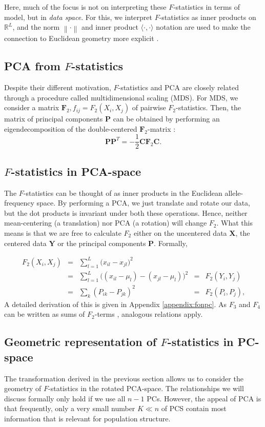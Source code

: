 \documentclass[12pt,a4pape, fullpage]{article}
\newcommand{\norm}[1]{\left\lVert#1\right\rVert}
\newcommand{\MX}{\mathbf{X}} %
\newcommand{\MC}{\mathbf{C}} %
\newcommand{\MY}{\mathbf{Y}} %
\newcommand{\MF}{\mathbf{F}_2} %
\newcommand{\MP}{\mathbf{P}} %
\begin{document}
Here, much of the focus is not on interpreting these $F$-statistics in terms of model, but in \emph{data space}. For this, we interpret $F$-statistics as inner products on $\mathbb{R}^L$, and the norm $\norm{\cdot}$ and inner product $\langle\cdot, \cdot \rangle$ notation are used to make the connection to Euclidean geometry more explicit \citep[see][for a thorough introduction to this interpretation]{oteo-garcia2021}.

\subsection{PCA from $F$-statistics}
Despite their different motivation, $F$-statistics and PCA are closely related through a procedure called multidimensional scaling (MDS). For MDS, we consider a matrix 	$\MF, f_{ij} = F_2(X_i, X_j)$ of pairwise $F_2$-statistics. Then, the matrix of principal components $\MP$ can be obtained by performing an eigendecomposition of the double-centered $\MF$-matrix  \cite{gower1966}:
\begin{equation}
\MP\MP^T = -\frac{1}{2} \MC \MF\MC \text{.}
\end{equation}


\subsection{$F$-statistics in PCA-space}
The $F$-statistics can be thought of as inner products in the Euclidean allele-frequency space. By performing a PCA, we just translate and rotate our data, but the dot products is invariant under both these operations. Hence, neither mean-centering (a translation) nor PCA (a rotation) will change $F_2$. What this means is that we are free to calculate $F_2$ either on the uncentered data $\MX$, the centered data $\MY$ or the principal components $\MP$. Formally,

\begin{align}
F_2(X_i, X_j) &=&  \sum_{l=1}^L \big( x_{il} -x_{jl}\big)^2 &&\nonumber\\ 
 &=& \sum_{l=1}^L \big( (x_{il} - \mu_l) -(x_{jl} -\mu_l)\big)^2  &=& F_2(Y_i, Y_j) \nonumber\\
 &=& \sum_k (P_{ik} - P_{jk})^2  &=& F_2(P_i, P_j) \text{,}
\end{align}
A detailed derivation of this is given in Appendix \ref{appendix:fonpc}.
As $F_3$ and $F_4$ can be written as sums of $F_2$-terms \citep{reich2009}, analogous relations apply.

\subsection{Geometric representation of $F$-statistics in PC-space}
The transformation derived in the previous section allows us to consider the geometry of $F$-statistics in the rotated PCA-space. The relationships we will discuss formally only hold if we use all $n-1$ PCs. However, the appeal of PCA is that frequently, only a very small number $K \ll n$ of PCS contain most information that is relevant for population structure.
\end{document}
